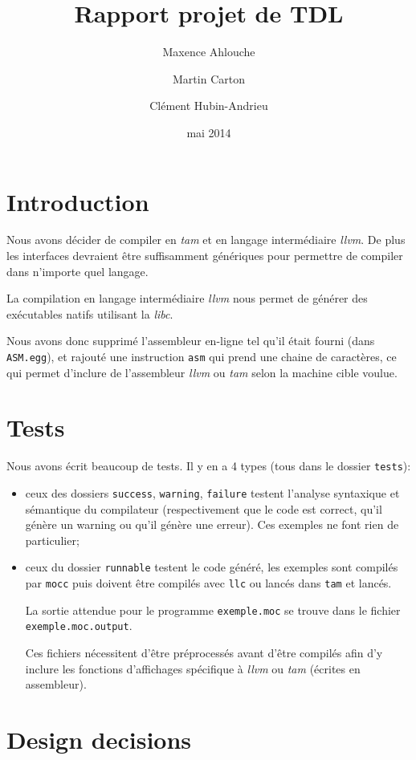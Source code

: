 \documentclass{scrartcl}
\title{Rapport projet de TDL}
\author{Maxence Ahlouche \and Martin Carton \and Clément Hubin-Andrieu}
\date{mai 2014}
\newcommand{\mocc}{\texttt{mocc}}
\newcommand{\llvm}{\textit{llvm}}
\newcommand{\tam} {\textit{tam}}
\begin{document}
  \maketitle
  \tableofcontents
  \newpage

\section{Introduction}
  Nous avons décider de compiler en \tam{} et en langage intermédiaire \llvm{}.
  De plus les interfaces devraient être suffisamment génériques pour permettre
  de compiler dans n'importe quel langage.

  La compilation en langage intermédiaire \llvm{} nous permet de générer des
  exécutables natifs utilisant la \textit{libc}.

  Nous avons donc supprimé l'assembleur en-ligne tel qu'il était fourni (dans
  \verb+ASM.egg+), et rajouté une instruction \verb+asm+ qui prend une chaine
  de caractères, ce qui permet d'inclure de l'assembleur \llvm{} ou \tam{}
  selon la machine cible voulue.

\section{Tests}
  Nous avons écrit beaucoup de tests. Il y en a 4 types (tous dans le
  dossier \verb+tests+):
  \begin{itemize}
    \item ceux des dossiers \verb+success+, \verb+warning+, \verb+failure+
      testent l'analyse syntaxique et sémantique du compilateur (respectivement
      que le code est correct, qu'il génère un warning ou qu'il génère une
      erreur). Ces exemples ne font rien de particulier;
    \item ceux du dossier \verb+runnable+ testent le code généré, les exemples
      sont compilés par \mocc{} puis doivent être compilés avec \verb+llc+
      ou lancés dans \verb+tam+ et lancés.

      La sortie attendue pour le programme \verb+exemple.moc+ se trouve dans
      le fichier \verb+exemple.moc.output+.

      Ces fichiers nécessitent d'être préprocessés avant d'être compilés afin
      d'y inclure les fonctions d'affichages spécifique à \llvm{} ou \tam{}
      (écrites en assembleur).
  \end{itemize}

\section{Design decisions}
\end{document}
